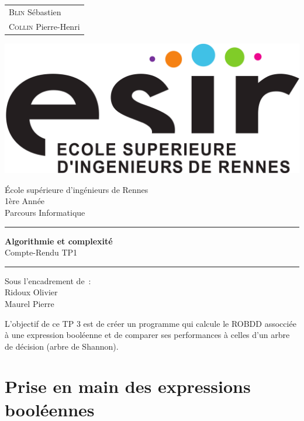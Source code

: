 \documentclass{article}
\begin{document}
\begin{titlepage}
	\vspace{-20px}
	\begin{tabular}{l}
		\textsc{Blin} S\'ebastien\\
		\textsc{Collin} Pierre-Henri
	\end{tabular}
	\hfill \vspace{10px}\includegraphics[scale=0.1]{esir.png}\\
	\vfill
	\begin{center}
		\Huge{\'Ecole sup\'erieure d'ing\'enieurs de Rennes}\\
		\vspace{1cm}
		\LARGE{1\`ere Ann\'ee}\\
		\large{Parcours Informatique}\\
		\vspace{0.5cm}\hrule\vspace{0.5cm}
		\LARGE{\textbf{Algorithmie et complexité}}\\
		\Large{Compte-Rendu TP1}
		\vspace{0.5cm}\hrule
		\vfill
		\vfill
	\end{center}
	\begin{flushleft}
		\Large{Sous l'encadrement de~:}\\
		\vspace{0.2cm}
		\large{{Ridoux} Olivier}\\
		\large{{Maurel} Pierre}
	\end{flushleft}
	\vfill
\end{titlepage}

L'objectif de ce TP 3 est de créer un programme qui calcule le ROBDD assocciée à une expression booléenne et de comparer ses performances à celles d'un arbre de décision (arbre de Shannon).
\section{Prise en main des expressions booléennes}
\end{document}
